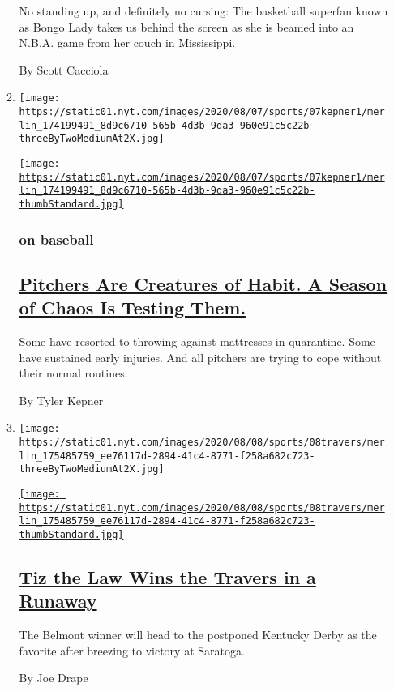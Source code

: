 \begin{enumerate}
\begin{enumerate}
    No standing up, and definitely no cursing: The basketball superfan
    known as Bongo Lady takes us behind the screen as she is beamed into
    an N.B.A. game from her couch in Mississippi.

    By Scott Cacciola
  \item
    \texttt{[image: https://static01.nyt.com/images/2020/08/07/sports/07kepner1/merlin\_174199491\_8d9c6710-565b-4d3b-9da3-960e91c5c22b-threeByTwoMediumAt2X.jpg]}

    \href{/2020/08/08/sports/baseball/mlb-pitching-injuries.html}{\texttt{[image: https://static01.nyt.com/images/2020/08/07/sports/07kepner1/merlin\_174199491\_8d9c6710-565b-4d3b-9da3-960e91c5c22b-thumbStandard.jpg]}}

    \hypertarget{on-baseball}{%
    \subsubsection{on baseball}\label{on-baseball}}

    \hypertarget{pitchers-are-creatures-of-habit-a-season-of-chaos-is-testing-them}{%
    \subsection{\texorpdfstring{\href{/2020/08/08/sports/baseball/mlb-pitching-injuries.html}{Pitchers
    Are Creatures of Habit. A Season of Chaos Is Testing
    Them.}}{Pitchers Are Creatures of Habit. A Season of Chaos Is Testing Them.}}\label{pitchers-are-creatures-of-habit-a-season-of-chaos-is-testing-them}}

    Some have resorted to throwing against mattresses in quarantine.
    Some have sustained early injuries. And all pitchers are trying to
    cope without their normal routines.

    By Tyler Kepner
  \item
    \texttt{[image: https://static01.nyt.com/images/2020/08/08/sports/08travers/merlin\_175485759\_ee76117d-2894-41c4-8771-f258a682c723-threeByTwoMediumAt2X.jpg]}

    \href{/2020/08/08/sports/horse-racing/tiz-the-law-travers.html}{\texttt{[image: https://static01.nyt.com/images/2020/08/08/sports/08travers/merlin\_175485759\_ee76117d-2894-41c4-8771-f258a682c723-thumbStandard.jpg]}}

    \hypertarget{tiz-the-law-wins-the-travers-in-a-runaway}{%
    \subsection{\texorpdfstring{\href{/2020/08/08/sports/horse-racing/tiz-the-law-travers.html}{Tiz
    the Law Wins the Travers in a
    Runaway}}{Tiz the Law Wins the Travers in a Runaway}}\label{tiz-the-law-wins-the-travers-in-a-runaway}}

    The Belmont winner will head to the postponed Kentucky Derby as the
    favorite after breezing to victory at Saratoga.

    By Joe Drape
  \end{enumerate}
\end{enumerate}

